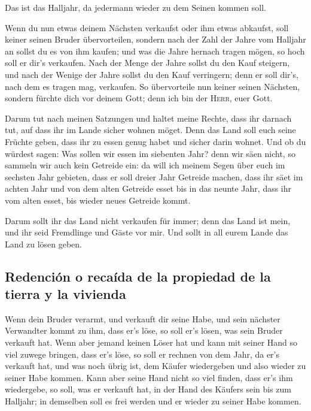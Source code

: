  Das ist das Halljahr, da jedermann wieder zu dem Seinen
kommen soll.

 Wenn du nun etwas deinem Nächsten verkaufst oder ihm
etwas abkaufst, soll keiner seinen Bruder übervorteilen, 
sondern nach der Zahl der Jahre vom Halljahr an sollst du es von ihm
kaufen; und was die Jahre hernach tragen mögen, so hoch soll er dir's
verkaufen.  Nach der Menge der Jahre sollst du den Kauf
steigern, und nach der Wenige der Jahre sollst du den Kauf verringern;
denn er soll dir's, nach dem es tragen mag, verkaufen. 
So übervorteile nun keiner seinen Nächsten, sondern fürchte dich vor
deinem Gott; denn ich bin der \textsc{Herr}, euer Gott.

 Darum tut nach meinen Satzungen und haltet meine Rechte,
dass ihr darnach tut, auf dass ihr im Lande sicher wohnen möget.
 Denn das Land soll euch seine Früchte geben, dass ihr zu
essen genug habet und sicher darin wohnet.  Und ob du
würdest sagen: Was sollen wir essen im siebenten Jahr? denn wir säen
nicht, so sammeln wir auch kein Getreide ein:  da will
ich meinem Segen über euch im sechsten Jahr gebieten, dass er soll
dreier Jahr Getreide machen,  dass ihr säet im achten
Jahr und von dem alten Getreide esset bis in das neunte Jahr, dass ihr
vom alten esset, bis wieder neues Getreide kommt.

 Darum sollt ihr das Land nicht verkaufen für immer; denn
das Land ist mein, und ihr seid Fremdlinge und Gäste vor mir.
 Und sollt in all eurem Lande das Land zu lösen geben.

\hypertarget{redenciuxf3n-o-recauxedda-de-la-propiedad-de-la-tierra-y-la-vivienda}{%
\subsection{Redención o recaída de la propiedad de la tierra y la
vivienda}\label{redenciuxf3n-o-recauxedda-de-la-propiedad-de-la-tierra-y-la-vivienda}}

 Wenn dein Bruder verarmt, und verkauft dir seine Habe,
und sein nächster Verwandter kommt zu ihm, dass er's löse, so soll er's
lösen, was sein Bruder verkauft hat.  Wenn aber jemand
keinen Löser hat und kann mit seiner Hand so viel zuwege bringen, dass
er's löse,  so soll er rechnen von dem Jahr, da er's
verkauft hat, und was noch übrig ist, dem Käufer wiedergeben und also
wieder zu seiner Habe kommen.  Kann aber seine Hand nicht
so viel finden, dass er's ihm wiedergebe, so soll, was er verkauft hat,
in der Hand des Käufers sein bis zum Halljahr; in demselben soll es frei
werden und er wieder zu seiner Habe kommen.

